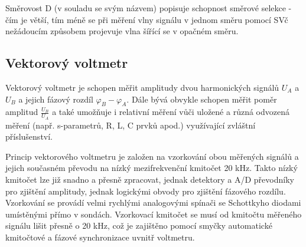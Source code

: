         Směrovost D (v souladu se svým názvem) popisuje schopnost směrové selekce - čím je větší, 
        tím méně se při měření vlny signálu v jednom směru pomocí SVč nežádoucím způsobem projevuje 
        vlna šířící se v opačném směru.
  
      \subsection{Vektorový voltmetr}
        Vektorový voltmetr je schopen měřit amplitudy dvou harmonických signálů \(U_A\) a \(U_B\) a 
        jejich fázový rozdíl \(\varphi_B - \varphi_A\). Dále bývá obvykle schopen měřit poměr 
        amplitud \(\frac{U_B}{U_A}\) a také umožňuje i relativní měření vůči uložené a různá 
        odvozená měření (např. s-parametrů, R, L, C prvků apod.) využívající zvláštní příslušenství.
  
        Princip vektorového voltmetru je založen na vzorkování obou měřených signálů a jejich 
        současném převodu na nízký mezifrekvenční kmitočet 20 kHz. Takto nízký kmitočet lze již 
        snadno a přesně zpracovat, jednak detektory a A/D převodníky pro zjištění amplitudy, jednak 
        logickými obvody pro zjištění fázového rozdílu. Vzorkování se provádí velmi rychlými 
        analogovými spínači se Schottkyho diodami umístěnými přímo v sondách. Vzorkovací kmitočet 
        se musí od kmitočtu měřeného signálu lišit přesně o 20 kHz, což je zajištěno pomocí smyčky 
        automatické kmitočtové a fázové synchronizace uvnitř voltmetru.  

